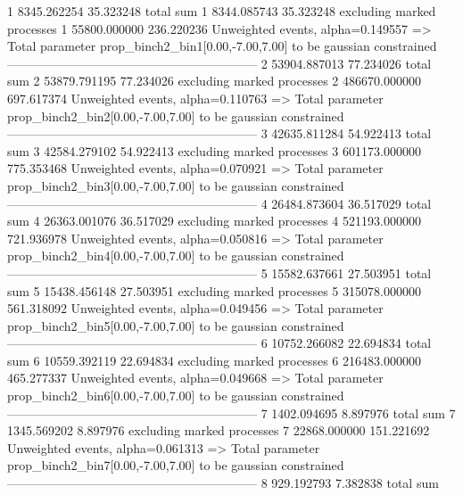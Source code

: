 1          8345.262254     35.323248       total sum                     
1          8344.085743     35.323248       excluding marked processes    
1          55800.000000    236.220236      Unweighted events, alpha=0.149557
  => Total parameter prop_binch2_bin1[0.00,-7.00,7.00] to be gaussian constrained
------------------------------------------------------------
2          53904.887013    77.234026       total sum                     
2          53879.791195    77.234026       excluding marked processes    
2          486670.000000   697.617374      Unweighted events, alpha=0.110763
  => Total parameter prop_binch2_bin2[0.00,-7.00,7.00] to be gaussian constrained
------------------------------------------------------------
3          42635.811284    54.922413       total sum                     
3          42584.279102    54.922413       excluding marked processes    
3          601173.000000   775.353468      Unweighted events, alpha=0.070921
  => Total parameter prop_binch2_bin3[0.00,-7.00,7.00] to be gaussian constrained
------------------------------------------------------------
4          26484.873604    36.517029       total sum                     
4          26363.001076    36.517029       excluding marked processes    
4          521193.000000   721.936978      Unweighted events, alpha=0.050816
  => Total parameter prop_binch2_bin4[0.00,-7.00,7.00] to be gaussian constrained
------------------------------------------------------------
5          15582.637661    27.503951       total sum                     
5          15438.456148    27.503951       excluding marked processes    
5          315078.000000   561.318092      Unweighted events, alpha=0.049456
  => Total parameter prop_binch2_bin5[0.00,-7.00,7.00] to be gaussian constrained
------------------------------------------------------------
6          10752.266082    22.694834       total sum                     
6          10559.392119    22.694834       excluding marked processes    
6          216483.000000   465.277337      Unweighted events, alpha=0.049668
  => Total parameter prop_binch2_bin6[0.00,-7.00,7.00] to be gaussian constrained
------------------------------------------------------------
7          1402.094695     8.897976        total sum                     
7          1345.569202     8.897976        excluding marked processes    
7          22868.000000    151.221692      Unweighted events, alpha=0.061313
  => Total parameter prop_binch2_bin7[0.00,-7.00,7.00] to be gaussian constrained
------------------------------------------------------------
8          929.192793      7.382838        total sum                     
